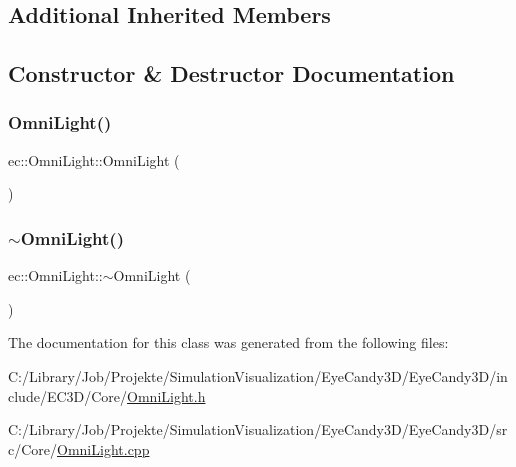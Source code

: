 \subsection*{Additional Inherited Members}


\subsection{Constructor \& Destructor Documentation}
\mbox{\label{classec_1_1_omni_light_aa0240a42641c82a0363f569fdc312f23}} 
\subsubsection{\texorpdfstring{Omni\+Light()}{OmniLight()}}
{\footnotesize\ttfamily ec\+::\+Omni\+Light\+::\+Omni\+Light (\begin{DoxyParamCaption}{ }\end{DoxyParamCaption})\hspace{0.3cm}{\ttfamily [explicit]}}

\mbox{\label{classec_1_1_omni_light_a58c4d1aaf29e659c03ee1193cbca3eed}} 
\subsubsection{\texorpdfstring{$\sim$\+Omni\+Light()}{~OmniLight()}}
{\footnotesize\ttfamily ec\+::\+Omni\+Light\+::$\sim$\+Omni\+Light (\begin{DoxyParamCaption}{ }\end{DoxyParamCaption})\hspace{0.3cm}{\ttfamily [default]}}



The documentation for this class was generated from the following files\+:\begin{DoxyCompactItemize}
\item 
C\+:/\+Library/\+Job/\+Projekte/\+Simulation\+Visualization/\+Eye\+Candy3\+D/\+Eye\+Candy3\+D/include/\+E\+C3\+D/\+Core/\mbox{\hyperlink{_omni_light_8h}{Omni\+Light.\+h}}\item 
C\+:/\+Library/\+Job/\+Projekte/\+Simulation\+Visualization/\+Eye\+Candy3\+D/\+Eye\+Candy3\+D/src/\+Core/\mbox{\hyperlink{_omni_light_8cpp}{Omni\+Light.\+cpp}}\end{DoxyCompactItemize}
